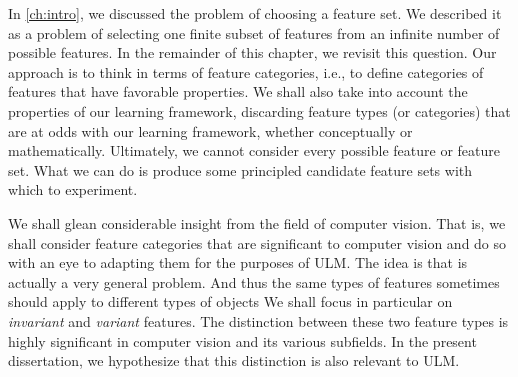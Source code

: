 
In \ref{ch:intro}, we discussed the problem of choosing a feature set. 
We described it as a problem of selecting one finite subset of 
features from an infinite number of possible features.
In the remainder of this chapter, we revisit this question. Our approach is to think in terms of feature categories, i.e., to define categories of features that have favorable properties. We shall also take into account the properties of our learning framework, discarding feature types (or categories) that are at odds with our learning framework, whether conceptually or mathematically. Ultimately, we cannot consider every possible feature or feature set. What we can do is produce some principled candidate feature sets with which to experiment. 

We shall glean considerable insight
from the field of computer vision. That is, we shall consider feature categories that 
are significant to computer vision and do so with an eye to adapting them for the purposes of \ac{ULM}. The idea is that 
is actually a very general problem. And thus the
same types of features sometimes should apply to different types of objects
We shall focus in particular on \emph{invariant} and \emph{variant} features. 
The distinction between these two feature types is highly significant in
computer vision and its various subfields. In the present dissertation, we hypothesize that this distinction is
also relevant to ULM. 


